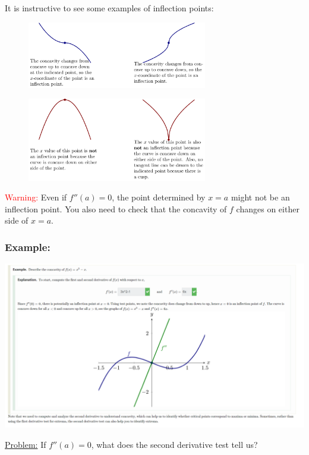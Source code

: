 \documentclass{article}
\begin{document}
It is instructive to see some examples of inflection points:

\begin{figure}[ht]
    \centering
    \includegraphics[width=0.7\textwidth]{imgs/digInConcavityAnd2ndDerivTest-figure4.png}
\end{figure}

\begin{figure}[ht]
    \centering
    \includegraphics[width=0.7\textwidth]{imgs/digInConcavityAnd2ndDerivTest-figure5.png}
\end{figure}

\textcolor{red}{Warning:} Even if $f''(a)=0$, the point determined by $x=a$ might not be an inflection point. You also need to check that the concavity of $f$ changes on either side of $x=a$.
\newpage 

\subsubsection*{Example:}
\begin{center}
\begin{minipage}{\linewidth}
    \centering
    \includegraphics[width=1.3\textwidth]{imgs/ex3.png}
\end{minipage}
\end{center}
\underline{Problem:}
If $f''(a)=0$, what does the second derivative test tell us?
\end{document}
